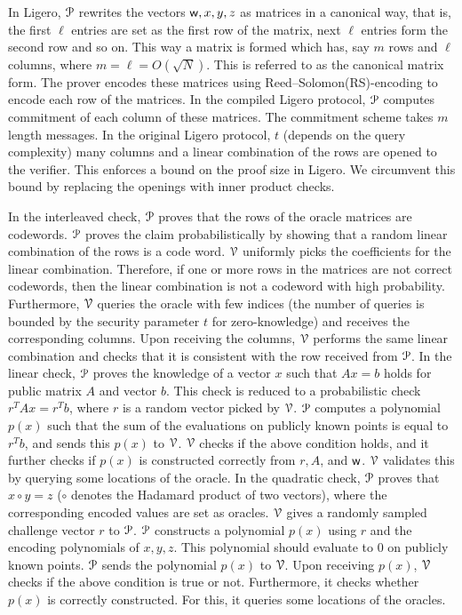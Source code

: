 In Ligero, $\mathcal{P}$ rewrites the vectors $\mathsf{w}, x, y, z$ as matrices in a canonical way, that is, the first $\ell$ entries are set as the first row of the matrix, next $\ell$ entries form the second row and so on. This way a matrix is formed which has, say $m$ rows and $\ell$ columns, where $m = \ell = O(\sqrt{N})$. This is referred to as the canonical matrix form. The prover encodes these matrices using Reed–Solomon(RS)-encoding to encode each row of the matrices.
In the compiled Ligero protocol, $\mathcal{P}$ computes commitment of each column of these matrices. The commitment scheme takes $m$ length messages. In the original Ligero protocol, $t$ (depends on the query complexity) many columns and a linear combination of the rows are opened to the verifier. This enforces a bound on the proof size in Ligero. We circumvent this bound by replacing the openings with inner product checks. 

In the interleaved check, $\mathcal{P}$ proves that the rows of the oracle matrices are codewords. $\mathcal{P}$ proves the claim probabilistically by showing that a random linear combination of the rows is a code word. $\mathcal{V}$ uniformly picks the coefficients for the linear combination.
Therefore, if one or more rows in the matrices are not correct codewords, then the linear combination is not a codeword with high probability. Furthermore, $\mathcal{V}$ queries the oracle with few indices (the number of queries is bounded by the security parameter $t$ for zero-knowledge) and receives the corresponding columns. Upon receiving the columns, $\mathcal{V}$ performs the same linear combination and checks that it is consistent with the row received from $\mathcal{P}$.
In the linear check, $\mathcal{P}$ proves the knowledge of a vector $x$ such that $Ax = b$ holds for public matrix $A$ and vector $b$. This check is reduced to a probabilistic check $r^TAx = r^T b$, where $r$ is a random vector picked by $\mathcal{V}$. $\mathcal{P}$ computes a polynomial $p(x)$ such that the sum of the evaluations on publicly known points is equal to $r^Tb$, and sends this $p(x)$ to $\mathcal{V}$. $\mathcal{V}$ checks if the above condition holds, and it further checks if $p(x)$ is constructed correctly from $r, A$, and $\mathsf{w}$. $\mathcal{V}$ validates this by querying some locations of the oracle.
In the quadratic check, $\mathcal{P}$ proves that $x \circ y = z$ ($\circ$ denotes the Hadamard product of two vectors), where the corresponding encoded values are set as oracles. $\mathcal{V}$ gives a randomly sampled challenge vector $r$ to $\mathcal{P}$. $\mathcal{P}$ constructs a polynomial $p(x)$ using $r$ and the encoding polynomials of $x, y, z$. This polynomial should evaluate to $0$ on publicly known points. $\mathcal{P}$ sends the polynomial $p(x)$ to $\mathcal{V}$. Upon receiving $p(x)$, $\mathcal{V}$ checks if the above condition is true or not. Furthermore, it checks whether $p(x)$ is correctly constructed. For this, it queries some locations of the oracles.

